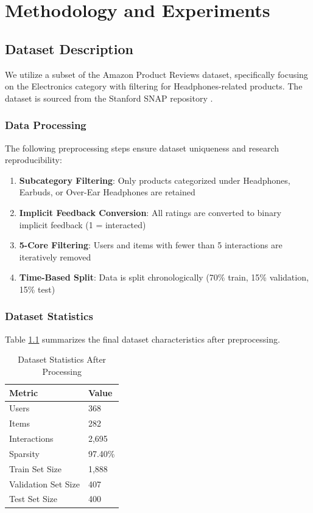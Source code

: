 %
%
\chapter{Methodology and Experiments}
\label{chap:methodology}
\setlength{\parskip}{1em}

\section{Dataset Description}

We utilize a subset of the Amazon Product Reviews dataset, specifically focusing on the Electronics category with filtering for Headphones-related products. The dataset is sourced from the Stanford SNAP repository \cite{mcauley2015image}.

\subsection{Data Processing}

The following preprocessing steps ensure dataset uniqueness and research reproducibility:
\begin{enumerate}
    \item \textbf{Subcategory Filtering}: Only products categorized under Headphones, Earbuds, or Over-Ear Headphones are retained
    \item \textbf{Implicit Feedback Conversion}: All ratings are converted to binary implicit feedback (1 = interacted)
    \item \textbf{5-Core Filtering}: Users and items with fewer than 5 interactions are iteratively removed
    \item \textbf{Time-Based Split}: Data is split chronologically (70\% train, 15\% validation, 15\% test)
\end{enumerate}

\subsection{Dataset Statistics}

Table \ref{tab:dataset} summarizes the final dataset characteristics after preprocessing.

\begin{table}[H]
\centering
\caption{Dataset Statistics After Processing}
\label{tab:dataset}
\begin{tabular}{ll}
\hline
\textbf{Metric} & \textbf{Value} \\
\hline
Users & 368 \\
Items & 282 \\
Interactions & 2,695 \\
Sparsity & 97.40\% \\
Train Set Size & 1,888 \\
Validation Set Size & 407 \\
Test Set Size & 400 \\
\hline
\end{tabular}
\end{table}

